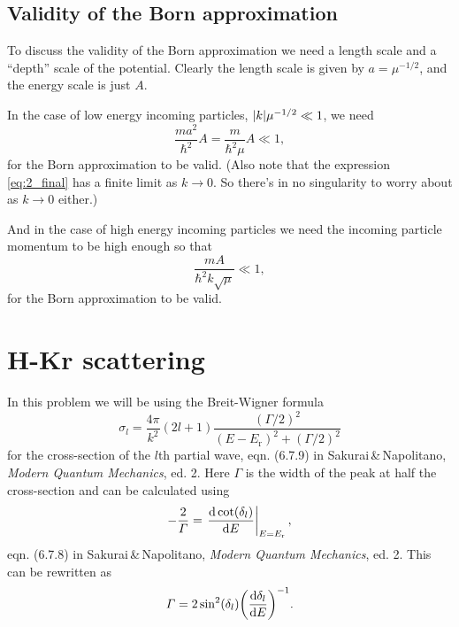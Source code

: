 \documentclass[11pt,letter, swedish, english
]{article}
\begin{document}
\subsection*{Validity of the Born approximation}

To discuss the validity of the Born approximation we need a length
scale and a ``depth'' scale of the potential. Clearly the length scale
is given by $a=\mu^{-1/2}$, and the energy scale is just $A$.

In the case of low energy incoming particles, $\abs{k}\mu^{-1/2}\ll1$,
we need  
\begin{equation}
\frac{ma^2}{\hbar^2}A=\frac{m}{\hbar^2\mu}A\ll1,
\end{equation}
for the Born approximation to be valid. (Also note that the expression
\eqref{eq:2_final} has a finite limit as $k\to0$. So there's in no
singularity to worry about as $k\to0$ either.)

And in the case of high energy incoming particles we need the incoming
particle momentum to be high enough so that
\begin{equation}
\frac{mA}{\hbar^2k\sqrt{\mu}}\ll1,
\end{equation}
for the Born approximation to be valid.








\section{H-Kr scattering}
\newcommand{\Er}{E_{\text{r}}}
\newcommand{\BW}{\text{(BW)}}

In this problem we will be using the Breit-Wigner formula
\begin{equation}\label{eq:3_BW}
\sigma_l=
\frac{4\pi}{k^2} (2l+1) \frac{(\varGamma/2)^2}{(E-\Er)^2+(\varGamma/2)^2}
\end{equation}
for the cross-section of the $l$th partial wave, eqn. (6.7.9) in
Sakurai\,\&\,Napolitano, \textit{Modern Quantum Mechanics},
ed. 2. Here $\varGamma$ is the width of the peak at half the
cross-section and can be calculated using
\begin{equation}
-\frac{2}{\varGamma} = \eval{\dv{\cot(\delta_l)}{E}}_{E=\Er},
\end{equation}
eqn. (6.7.8)  in Sakurai\,\&\,Napolitano, 
\textit{Modern Quantum Mechanics}, ed. 2. This can be rewritten as
\begin{equation}\label{eq:3_Gamma}
\varGamma=2\sin^2(\delta_l) \qty(\dv{\delta_l}{E})^{-1}.
\end{equation}
\end{document}
